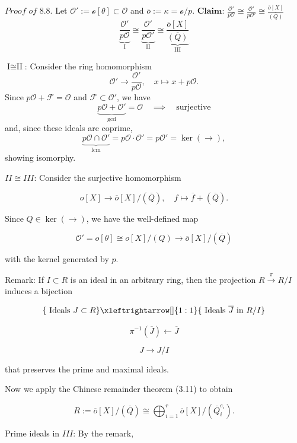 \( \textit{Proof of 8.8.} \) 
Let \(\mathcal{O}' := \mathcal{o}[\theta] \subset \mathcal{O}\) and \(\overline{o} := \kappa = \mathcal{o}/p\).
\( \textbf{Claim:} \) 
\(\frac{\mathcal{O}'}{p\mathcal{O}} \cong \frac{\mathcal{O}'}{p\mathcal{O}'} \cong \frac{\overline{o}[X]}{\overline{(Q)}}\)
\[
\underbrace{\frac{\mathcal{O}'}{p\mathcal{O}}}_{\text{I}} \cong \underbrace{\frac{\mathcal{O}'}{p\mathcal{O}'}}_{\text{II}} \cong \underbrace{\frac{\overline{o}[X]}{\overline{(Q)}}}_{\text{III}}
\]

\(\text{I} \cong \text{II}\): 
Consider the ring homomorphism 
\[
\mathcal{O}' \rightarrow \frac{\mathcal{O}'}{p\mathcal{O}}, \quad x \mapsto x + p\mathcal{O}.
\]
Since \(p\mathcal{O} + \mathscr{F} = \mathcal{O}\) and \(\mathscr{F} \subset \mathcal{O}'\), we have
\[
\underbrace{p\mathcal{O} + \mathcal{O}'}_{\text{gcd}} = \mathcal{O} \quad \implies \quad \text{surjective}
\]
and, since these ideals are coprime,
\[
\underbrace{p\mathcal{O} \cap \mathcal{O}'}_{\text{lcm}} = p\mathcal{O} \cdot \mathcal{O}' = p\mathcal{O}' = \ker(\rightarrow),
\]
showing isomorphy.

\(II \cong III\): Consider the surjective homomorphism

\[
o[X] \longrightarrow \overline{o}[X]/(\overline{Q}), \quad f \mapsto \overline{f} + (\overline{Q}).
\]

Since \( Q \in \ker(\rightarrow) \), we have the well-defined map

\[
\mathcal{O}' = o[\theta] \cong o[X]/(Q) \longrightarrow \overline{o}[X]/(\overline{Q})
\]

with the kernel generated by \( p \).

Remark: If \( I \subset R \) is an ideal in an arbitrary ring, then the projection 
\( R \overset{\pi}{\longrightarrow} R/I \)
induces a bijection

\[
\{ \text{ Ideals } J \subset R \} \xleftrightarrow[]{1:1} \{ \text{ Ideals } \overline{J} \text{ in } R/I \}
\]

\[
\pi^{-1}(\overline{J}) \longleftarrow \overline{J} 
\]

\[
J \longrightarrow J/I
\]

that preserves the prime and maximal ideals.

Now we apply the Chinese remainder theorem (3.11) to obtain

\[
R := \overline{o}[X]/(\overline{Q}) \cong \bigoplus_{i=1}^{r} \overline{o}[X]/(\overline{Q}_i^{e_i}).
\]

Prime ideals in \(III\): By the remark,

